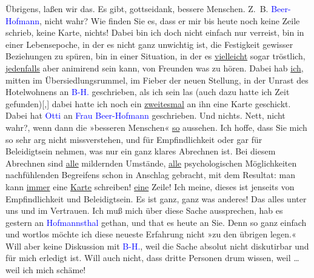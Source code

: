 \pstart
           Übrigens, laßen wir das. Es gibt, gottseidank, bessere Menschen. Z. B. \textcolor{blue}{Beer-Hofmann}{}\ledrightnote{\textcolor{blue}{Richard Beer-Hofmann}}, nicht wahr? Wie finden Sie es,
               dass er mir bis heute noch keine Zeile schrieb, keine Karte, nichts! Dabei bin ich
               doch nicht einfach nur verreist, bin in einer Lebensepoche, in der es nicht ganz
               unwichtig ist, die Festigkeit gewisser Beziehungen zu spüren, bin in einer Situation,
               in der es \uline{vielleicht} sogar tröstlich, \uline{jedenfalls} aber animirend sein kann, von Freunden was
               zu hören. Dabei hab \uline{ich}, mitten im
               Übersiedlungsrummel, im Fieber der neuen Stellung, in der Unrast des Hotelwohnens an
                  \textcolor{blue}{B-H.}{}\ledrightnote{\textcolor{blue}{Richard Beer-Hofmann}} geschrieben, als ich sein \label{K_L03415-6v}\label{K_L03415-6h} las (auch dazu hatte ich Zeit
                  gefunden){[},{]} dabei hatte ich noch ein \uline{zweitesmal} an ihn eine Karte geschickt. Dabei hat \textcolor{blue}{Otti}{}\ledrightnote{\textcolor{blue}{Ottilie Salten}} an \textcolor{blue}{Frau
                  Beer-Hofmann}{}\ledrightnote{\textcolor{blue}{Paula Beer-Hofmann}} geschrieben. Und nichts. Nett, nicht wahr?, wenn dann die
               »besseren Menschen« \uline{so} aussehen. Ich hoffe, dass Sie
               mich so sehr arg nicht missverstehen, und für Empfindlichkeit oder gar für
               Beleidigtsein nehmen, was nur ein ganz klares Abrechnen ist. Bei diesem Abrechnen
               sind \uline{alle} mildernden Umstände, \uline{alle} psychologischen Möglichkeiten nachfühlenden Begreifens schon in
               Anschlag gebracht, mit dem Resultat: man kann \uline{immer}
               eine \uline{Karte} schreiben! \uline{eine} Zeile! Ich meine, dieses ist jenseits von Empfindlichkeit und
               Beleidigtsein. Es ist ganz, ganz was anderes! Das alles unter uns und im Vertrauen.
               Ich muß mich über diese Sache aussprechen, hab es gestern an \textcolor{blue}{Hofmannsthal}{}\ledrightnote{\textcolor{blue}{Hugo von Hofmannsthal}} gethan, und that es heute an Sie. Denn so ganz
               einfach und wortlos möchte ich diese neueste Erfahrung nicht »zu den übrigen legen.«
               Will aber keine Diskussion mit \textcolor{blue}{B-H.}{}\ledrightnote{\textcolor{blue}{Richard Beer-Hofmann}}, weil die
               Sache absolut nicht diskutirbar und für mich erledigt ist. Will auch nicht, dass
               dritte Personen drum wissen, weil {\dots} weil ich mich schäme! \pend
           
